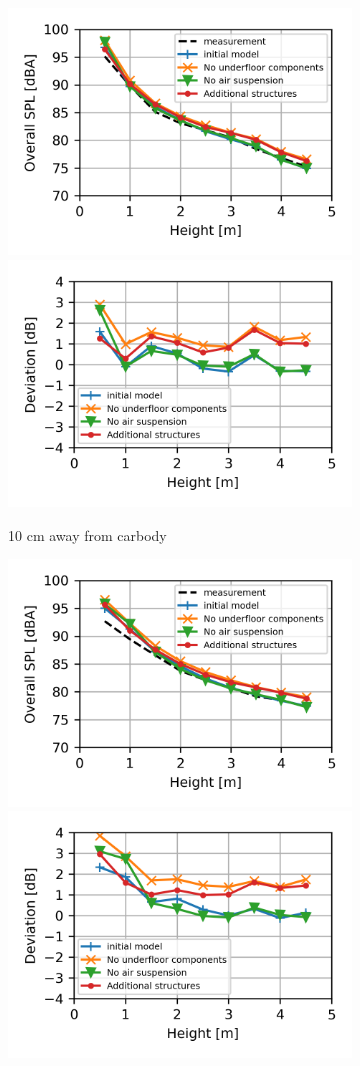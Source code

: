 \begin{figure}[H]
	\centering
	\begin{subfigure}[b]{\textwidth}
		\centering
		\includegraphics[width=0.49\linewidth]{fig/chap5/geometry_variation/overall_SPL/pos_a.png}
		\includegraphics[width=0.49\linewidth]{fig/chap5/geometry_variation/overall_SPL/pos_a_deviation.png}
		\caption{10 cm away from carbody}
	\end{subfigure}
	\begin{subfigure}[b]{\textwidth}
		\centering
		\includegraphics[width=0.49\linewidth]{fig/chap5/geometry_variation/overall_SPL/pos_f.png}
		\includegraphics[width=0.49\linewidth]{fig/chap5/geometry_variation/overall_SPL/pos_f_deviation.png}

\end{subfigure}
\end{figure}
